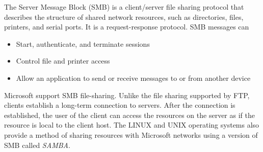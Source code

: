 The Server Message Block (SMB) is a client/server file sharing protocol that describes the structure of shared network resources, such as directories, files, printers, and serial ports. It is a request-response protocol. SMB messages can

\begin{itemize}
\item Start, authenticate, and terminate sessions
\item Control file and printer access
\item Allow an application to send or receive messages to or from another device
\end{itemize}

Microsoft support SMB file-sharing. Unlike the file sharing supported by FTP, clients establish a long-term connection to servers. After the connection is established, the user of the client can access the resources on the server as if the resource is local to the client host. The LINUX and UNIX operating systems also provide a method of sharing resources with Microsoft networks using a version of SMB called \emph{SAMBA}. 